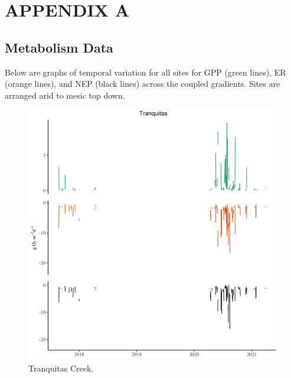 %

\chapter{APPENDIX A}

\section{Metabolism Data}

Below are graphs of temporal variation for all sites for GPP (green lines), ER (orange lines), and NEP (black lines) across the coupled gradients. Sites are arranged arid to mesic top down. 


\begin{figure}[htb]
\begin{center}
\includegraphics[scale=0.2]{Figs/TRC.png}
\caption{Tranquitas Creek.}
\label{Fig:TRC}
\end{center}
\end{figure}


